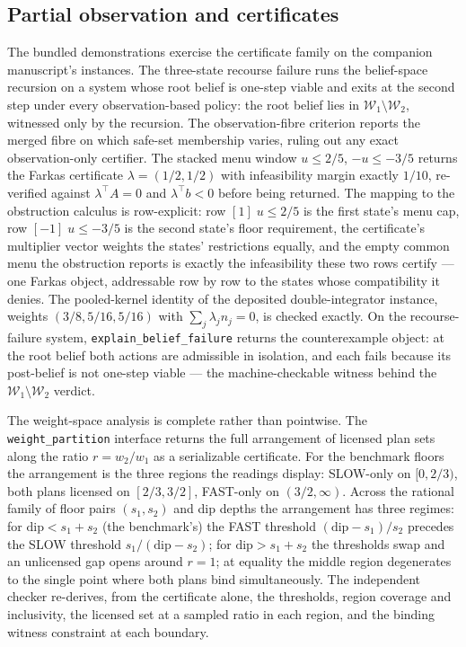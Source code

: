 \documentclass[3p,11pt]{elsarticle}
\begin{document}
\subsection{Partial observation and certificates}\label{sec:partial}

The bundled demonstrations exercise the certificate family on the companion
manuscript's instances. The three-state recourse failure runs the
belief-space recursion on a system whose root belief is one-step viable and
exits at the second step under every observation-based policy: the root
belief lies in $\mathcal{W}_1 \setminus \mathcal{W}_2$, witnessed only by
the recursion. The observation-fibre criterion reports the merged fibre on
which safe-set membership varies, ruling out any exact observation-only
certifier. The stacked menu window $u \leq 2/5$, $-u \leq -3/5$ returns the
Farkas certificate $\lambda = (1/2, 1/2)$ with infeasibility margin exactly
$1/10$, re-verified against $\lambda^{\top} A = 0$ and
$\lambda^{\top} b < 0$ before being returned. The mapping to the
obstruction calculus is row-explicit: row $[1]\; u \leq 2/5$ is the first
state's menu cap, row $[-1]\; u \leq -3/5$ is the second state's floor
requirement, the certificate's multiplier vector weights the states'
restrictions equally, and the empty common menu the obstruction reports
is exactly the infeasibility these two rows certify --- one Farkas object,
addressable row by row to the states whose compatibility it denies. The pooled-kernel identity of the deposited
double-integrator instance, weights $(3/8, 5/16, 5/16)$ with
$\sum_j \lambda_j n_j = 0$, is checked exactly. On the recourse-failure
system, \texttt{explain\_belief\_failure} returns the counterexample
object: at the root belief both actions are admissible in isolation, and
each fails because its post-belief is not one-step viable --- the
machine-checkable witness behind the
$\mathcal{W}_1 \setminus \mathcal{W}_2$ verdict.

The weight-space analysis is complete rather than pointwise. The
\texttt{weight\_partition} interface returns the full arrangement of
licensed plan sets along the ratio $r = w_2/w_1$ as a serializable
certificate. For the benchmark floors the arrangement is the three regions
the readings display: SLOW-only on $[0, 2/3)$, both plans licensed on
$[2/3, 3/2]$, FAST-only on $(3/2, \infty)$. Across the rational family of
floor pairs $(s_1, s_2)$ and dip depths the arrangement has three regimes:
for $\mathrm{dip} < s_1 + s_2$ (the benchmark's) the FAST threshold
$(\mathrm{dip} - s_1)/s_2$ precedes the SLOW threshold
$s_1/(\mathrm{dip} - s_2)$; for $\mathrm{dip} > s_1 + s_2$ the thresholds
swap and an unlicensed gap opens around $r = 1$; at equality the middle
region degenerates to the single point where both plans bind
simultaneously. The independent checker re-derives, from the certificate
alone, the thresholds, region coverage and inclusivity, the licensed set at
a sampled ratio in each region, and the binding witness constraint at each
boundary.
\end{document}
